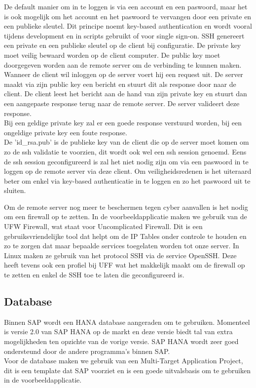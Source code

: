             De default manier om in te loggen is via een account en een paswoord, maar het is ook mogelijk om het account en het paswoord te vervangen door een private en een publieke sleutel. Dit principe noemt key-based authentication en wordt vooral tijdens development en in scripts gebruikt of voor single sign-on. SSH genereert een private en een publieke sleutel op de client bij configuratie. De private key moet veilig bewaard worden op de client computer. De public key moet doorgegeven worden aan de remote server om de verbinding te kunnen maken.\\
            Wanneer de client wil inloggen op de server voert hij een request uit. De server maakt via zijn public key een bericht en stuurt dit als response door naar de client. De client leest het bericht aan de hand van zijn private key en stuurt dan een aangepaste response terug naar de remote server. De server valideert deze response.\\
            Bij een geldige private key zal er een goede response verstuurd worden, bij een ongeldige private key een foute response.
            \\
            De 'id\_rsa.pub' is de publieke key van de client die op de server moet komen om zo de ssh validatie te voorzien, dit wordt ook wel een ssh session genoemd. Eens de ssh session geconfigureerd is zal het niet nodig zijn om via een paswoord in te loggen op de remote server via deze client.
            Om veiligheidsredenen is het uiteraard beter om enkel via key-based authenticatie in te loggen en zo het paswoord uit te sluiten.
            
            Om de remote server nog meer te beschermen tegen cyber aanvallen is het nodig om een firewall op te zetten. In de voorbeeldapplicatie maken we gebruik van de UFW Firewall, wat staat voor Uncomplicated Firewall. Dit is een gebruiksvriendelijke tool dat helpt om de IP Tables onder controle te houden en zo te zorgen dat maar bepaalde services toegelaten worden tot onze server.
            In Linux maken ze gebruik van het protocol SSH via de service OpenSSH. Deze heeft tevens ook een profiel bij UFF wat het makkelijk maakt om de firewall op te zetten en enkel de SSH toe te laten die geconfigureerd is.
            
        \subsection{Database}
        Binnen SAP wordt een HANA database aangeraden om te gebruiken. Momenteel is versie 2.0 van SAP HANA op de markt en deze versie biedt tal van extra mogelijkheden ten opzichte van de vorige versie. SAP HANA wordt zeer goed ondersteund door de andere programma's binnen SAP.\\
        Voor de database maken we gebruik van een Multi-Target Application Project, dit is een template dat SAP voorziet en is een goede uitvalsbasis om te gebruiken in de voorbeeldapplicatie.
        
